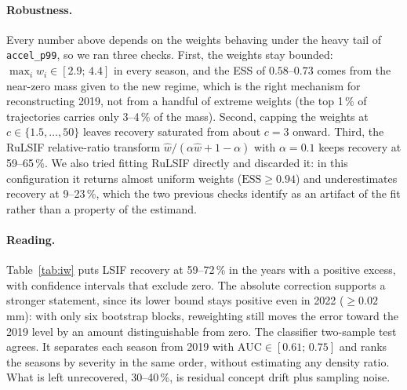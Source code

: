 \documentclass[runningheads]{llncs}
\begin{document}
\paragraph{Robustness.}
Every number above depends on the weights behaving under the heavy tail of
\texttt{accel\_p99}, so we ran three checks. First, the weights stay bounded:
$\max_i \hat{w}_i \in [2.9;\,4.4]$ in every season, and the ESS of
$0.58$--$0.73$ comes from the near-zero mass given to the new regime, which is
the right mechanism for reconstructing 2019, not from a handful of extreme
weights (the top 1\,\% of trajectories carries only 3--4\,\% of the mass).
Second, capping the weights at $c \in \{1.5,\ldots,50\}$ leaves recovery
saturated from about $c = 3$ onward. Third, the RuLSIF relative-ratio transform
$\hat{w}/(\alpha\hat{w}+1-\alpha)$ with $\alpha = 0.1$ keeps recovery at
59--65\,\%. We also tried fitting RuLSIF directly and discarded it: in this
configuration it returns almost uniform weights ($\mathrm{ESS} \geq 0.94$) and
underestimates recovery at 9--23\,\%, which the two previous checks identify as
an artifact of the fit rather than a property of the estimand.

\paragraph{Reading.}
Table~\ref{tab:iw} puts LSIF recovery at 59--72\,\% in the years with a
positive excess, with confidence intervals that exclude zero. The absolute
correction supports a stronger statement, since its lower bound stays positive
even in 2022 ($\geq 0.02$\,mm): with only six bootstrap blocks, reweighting
still moves the error toward the 2019 level by an amount distinguishable from
zero. The classifier two-sample test agrees. It separates each season from 2019
with $\mathrm{AUC} \in [0.61;\,0.75]$ and ranks the seasons by severity in the
same order, without estimating any density ratio. What is left unrecovered,
30--40\,\%, is residual concept drift plus sampling noise.
\end{document}
